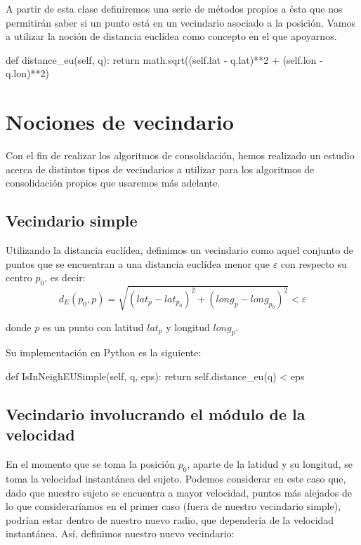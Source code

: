 \documentclass[a4paper, 12pt]{article}
\begin{document}
A partir de esta clase definiremos una serie de m\'etodos propios a \'esta que nos permitir\'an saber si un punto est\'a en un vecindario asociado a la posici\'on. Vamos a utilizar la noci\'on de distancia eucl\'idea como concepto en el que apoyarnos.\\

\begin{python}
        def distance_eu(self, q):
                return math.sqrt((self.lat - q.lat)**2 
                	+ (self.lon - q.lon)**2)
\end{python}


\pagebreak
\section{Nociones de vecindario}

Con el fin de realizar los algoritmos de consolidaci\'on, hemos realizado un estudio acerca de distintos tipos de vecindarios a utilizar para los algoritmos de consolidaci\'on propios que usaremos m\'as adelante.\\

\subsection{Vecindario simple}

Utilizando la distancia eucl\'idea, definimos un vecindario como aquel conjunto de puntos que se  encuentran a una distancia eucl\'idea menor que $\varepsilon$ con respecto su centro $p_0$, es decir:\\

$$ d_E(p_0, p) = \sqrt{(lat_{p} - lat_{p_0})^2 + (long_{p} - long_{p_0})^2 } < \varepsilon $$

donde $p$ es un punto con latitud $lat_{p}$ y longitud $long_{p}$.

Su implementaci\'on en Python es la siguiente:\\

\begin{python}
        def IsInNeighEUSimple(self, q, eps):
                return self.distance_eu(q) < eps
\end{python}


\subsection{Vecindario involucrando el m\'odulo de la velocidad}

En el momento que se toma la posici\'on $p_0$, aparte de la latidud y su longitud, se toma la velocidad instant\'anea del sujeto. Podemos considerar en este caso que, dado que nuestro sujeto se  encuentra a mayor velocidad, puntos m\'as alejados de lo que considerar\'iamos en el primer caso (fuera de nuestro vecindario simple), podr\'ian estar dentro de nuestro nuevo radio, que depender\'ia de la velocidad instant\'anea. As\'i, definimos nuestro nuevo vecindario:\\
\end{document}
